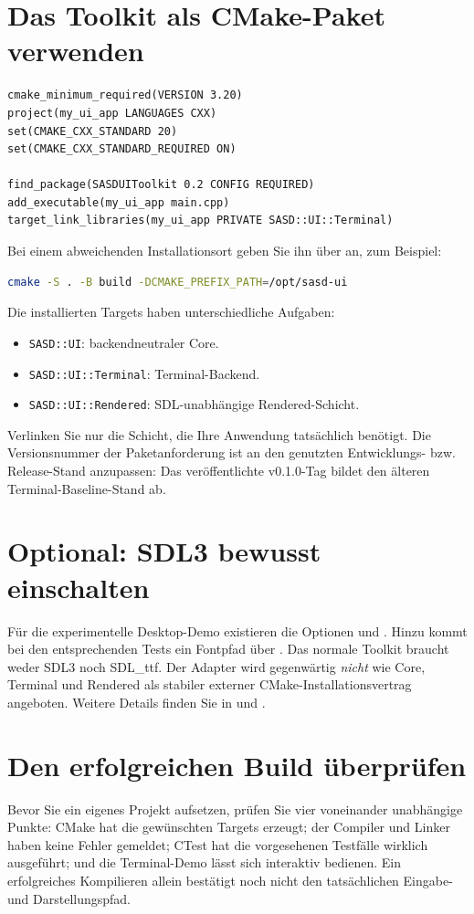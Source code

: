 \section{Das Toolkit als CMake-Paket verwenden}
\begin{lstlisting}[language={},caption={Auszug aus CMakeLists.txt}]
cmake_minimum_required(VERSION 3.20)
project(my_ui_app LANGUAGES CXX)
set(CMAKE_CXX_STANDARD 20)
set(CMAKE_CXX_STANDARD_REQUIRED ON)

find_package(SASDUIToolkit 0.2 CONFIG REQUIRED)
add_executable(my_ui_app main.cpp)
target_link_libraries(my_ui_app PRIVATE SASD::UI::Terminal)
\end{lstlisting}
Bei einem abweichenden Installationsort geben Sie ihn über
 an, zum Beispiel:
\begin{lstlisting}[language=bash]
cmake -S . -B build -DCMAKE_PREFIX_PATH=/opt/sasd-ui
\end{lstlisting}
Die installierten Targets haben unterschiedliche Aufgaben:
\begin{itemize}
\item \texttt{SASD::UI}: backendneutraler Core.
\item \texttt{SASD::UI::Terminal}: Terminal-Backend.
\item \texttt{SASD::UI::Rendered}: SDL-unabhängige Rendered-Schicht.
\end{itemize}
Verlinken Sie nur die Schicht, die Ihre Anwendung tatsächlich benötigt.
Die Versionsnummer der Paketanforderung ist an den genutzten
Entwicklungs- bzw. Release-Stand anzupassen: Das veröffentlichte
v0.1.0-Tag bildet den älteren Terminal-Baseline-Stand ab.

\section{Optional: SDL3 bewusst einschalten}
Für die experimentelle Desktop-Demo existieren die Optionen
 und
. Hinzu kommt bei den
entsprechenden Tests ein Fontpfad über
.
Das normale Toolkit braucht weder SDL3 noch SDL\_ttf.
Der Adapter wird gegenwärtig \emph{nicht} wie Core, Terminal und
Rendered als stabiler externer CMake-Installationsvertrag angeboten.
Weitere Details finden Sie in  und
.

\section{Den erfolgreichen Build überprüfen}
Bevor Sie ein eigenes Projekt aufsetzen, prüfen Sie vier voneinander
unabhängige Punkte: CMake hat die gewünschten Targets erzeugt;
der Compiler und Linker haben keine Fehler gemeldet; CTest
hat die vorgesehenen Testfälle wirklich ausgeführt; und die
Terminal-Demo lässt sich interaktiv bedienen. Ein erfolgreiches
Kompilieren allein bestätigt noch nicht den tatsächlichen
Eingabe- und Darstellungspfad.


